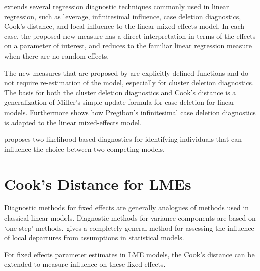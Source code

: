 \documentclass[12pt, a4paper]{article}
\begin{document}
\citet{Demi} extends several regression diagnostic techniques commonly used in linear regression, such as leverage, infinitesimal influence, case deletion diagnostics, Cook's distance, and local influence to the linear mixed-effects model. In each case, the proposed new measure has a direct interpretation in terms of the effects on a parameter of interest, and reduces to the familiar linear regression measure when there are no random effects. 

The new measures that are proposed by \citet{Demi} are explicitly defined functions and do not require re-estimation of the model, especially for cluster deletion diagnostics. The basis for both the cluster deletion diagnostics and Cook's distance is a generalization of Miller's simple update formula for case deletion for linear models. Furthermore \citet{Demi} shows how Pregibon's infinitesimal case deletion diagnostics is adapted to the linear mixed-effects model. 


%
%
%

\citet{Demi} proposes two likelihood-based diagnostics for identifying individuals that can influence the choice between two competing models.


\newpage



\section{Cook's Distance for LMEs} %
Diagnostic methods for fixed effects are generally analogues of methods used in classical linear models.
Diagnostic methods for variance components are based on `one-step' methods. \citet{cook86} gives a completely general method for assessing the influence of local departures from assumptions in statistical models.

For fixed effects parameter estimates in LME models, the  Cook's distance can be extended to measure influence on these fixed effects.
\end{document}
